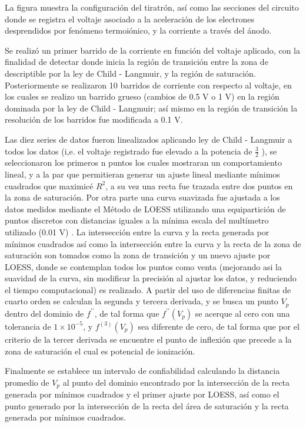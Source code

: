 La figura \ut{\ref{fig:circuit}} muestra la configuración del tiratrón, así como las secciones del circuito donde se registra el voltaje asociado a la aceleración de los electrones desprendidos por fenómeno termoiónico, y la corriente a través del ánodo.

Se realizó un primer barrido de la corriente en función del voltaje aplicado, con la finalidad de detectar donde inicia la región de transición entre la zona de descriptible por la ley de Child - Langmuir, y la región de saturación. Posteriormente se realizaron 10 barridos de corriente con respecto al voltaje, en los cuales se realizo un barrido grueso (cambios de 0.5 V o 1 V) en la región dominada por la ley de Child - Langmuir; así mismo en la región de transición la resolución de los barridos fue modificada a 0.1 V. 

Las diez series de datos fueron linealizados aplicando ley de Child - Langmuir a todos los datos (i,e. el voltaje registrado fue elevado a la potencia de $\frac{3}{2}$ ), se seleccionaron los primeros n puntos los cuales mostraran un comportamiento lineal, y a la par que permitieran generar un ajuste lineal mediante mínimos cuadrados que maximicé $R^{2}$, a su vez una recta fue trazada entre dos puntos en la zona de saturación. Por otra parte una curva suavizada fue ajustada a los datos medidos mediante el Método de LOESS utilizando una equipartición de puntos discretos con distancias iguales a la mínima escala del multímetro utilizado (0.01 V) . La intersección entre la curva y la recta generada por mínimos cuadrados así como la intersección entre la curva y la recta de la zona de saturación son tomados como la zona de transición y un nuevo ajuste por LOESS, donde se contemplan todos los puntos como venta (mejorando asi la suavidad de la curva, sin modificar la precisión al ajustar los datos, y reduciendo el tiempo computacional) es realizado. A partir del uso de diferencias finitas de cuarto orden se calculan la segunda y tercera derivada, y se busca un punto $V_{p}$ dentro del dominio de $f^{\prime \prime}$, de tal forma que $f^{\prime \prime}(V_{p})$ se acerque al cero con una tolerancia de $1\times10^{-5}$, y  $f^{(3)}(V_{p})$ sea diferente de cero, de tal forma que por el criterio de la tercer derivada se encuentre el punto de inflexión que precede a la zona de saturación el cual es potencial de ionización. 

Finalmente se establece un intervalo de confiabilidad calculando la distancia promedio de $V_{p}$  al punto del dominio encontrado por la intersección de la recta generada por mínimos cuadrados y el primer ajuste por LOESS, así como el punto generado por la intersección de la recta del área de saturación y la recta generada por mínimos cuadrados. 